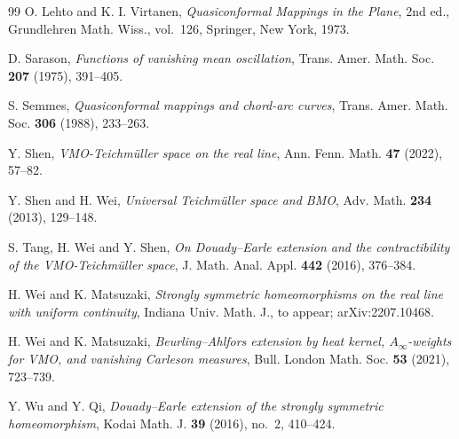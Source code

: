 \begin{thebibliography}{99}
 O. Lehto and K. I. Virtanen, \textit{Quasiconformal Mappings in the Plane}, 2nd ed., Grundlehren Math. Wiss., vol.~126, Springer, New York, 1973.

 D. Sarason, \textit{Functions of vanishing mean oscillation}, Trans. Amer. Math. Soc. \textbf{207} (1975), 391--405.

 S. Semmes, \textit{Quasiconformal mappings and chord-arc curves}, Trans. Amer. Math. Soc. \textbf{306} (1988), 233--263.

 Y. Shen, \textit{VMO-Teichm\"uller space on the real line}, Ann. Fenn. Math. \textbf{47} (2022), 57--82.

 Y. Shen and H. Wei, \textit{Universal Teichm\"uller space and BMO}, Adv. Math. \textbf{234} (2013), 129--148.

 S. Tang, H. Wei and Y. Shen, \textit{On Douady--Earle extension and the contractibility of the VMO-Teichm\"uller space}, J. Math. Anal. Appl. \textbf{442} (2016), 376--384.

 H. Wei and K. Matsuzaki, \textit{Strongly symmetric homeomorphisms on the real line with uniform continuity}, Indiana Univ. Math. J., to appear; arXiv:2207.10468.

 H. Wei and K. Matsuzaki, \textit{Beurling--Ahlfors extension by heat kernel, $A_\infty$-weights for VMO, and vanishing Carleson measures}, Bull. London Math. Soc. \textbf{53} (2021), 723--739.

 Y. Wu and Y. Qi, \textit{Douady--Earle extension of the strongly symmetric homeomorphism}, Kodai Math. J. \textbf{39} (2016), no.~2, 410--424.

\end{thebibliography}
